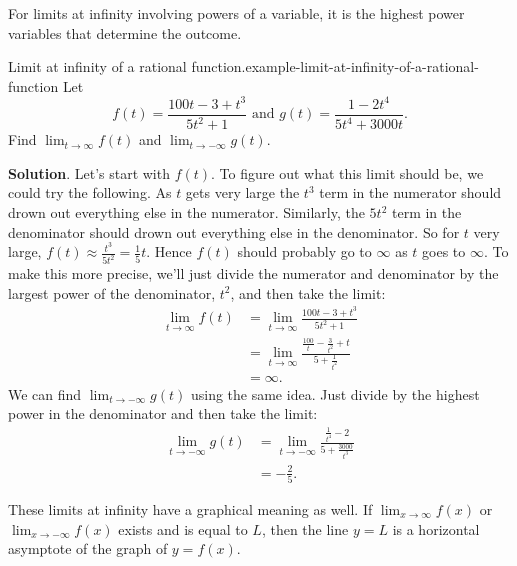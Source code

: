 \documentclass[10pt,]{book}
\numberwithin{equation}{section}
\begin{document}
\hypertarget{p-67}{}%
For limits at infinity involving powers of a variable, it is the highest power variables that determine the outcome.%
\begin{example}{Limit at infinity of a rational function.}{example-limit-at-infinity-of-a-rational-function}%
\hypertarget{p-68}{}%
Let%
\begin{equation*}
f(t) = \frac{100t - 3 + t^{3}}{5t^{2}+1}\text{ and } g(t) = \frac{1-2t^{4}}{5t^{4}+3000t}.
\end{equation*}
Find \(\lim_{t\to\infty} f(t)\) and \(\lim_{t\to-\infty}g(t)\).%
\par\smallskip%
\noindent\textbf{Solution}.\hypertarget{solution-14}{}\quad%
\hypertarget{p-69}{}%
Let's start with \(f(t)\). To figure out what this limit should be, we could try the following. As \(t\) gets very large the \(t^{3}\) term in the numerator should drown out everything else in the numerator. Similarly, the \(5t^{2}\) term in the denominator should drown out everything else in the denominator. So for \(t\) very large, \(f(t)\approx\frac{t^{3}}{5t^{2}} = \frac{1}{5}t\). Hence \(f(t)\) should probably go to \(\infty\) as \(t\) goes to \(\infty\). To make this more precise, we'll just divide the numerator and denominator by the largest power of the denominator, \(t^{2}\), and then take the limit:%
%
\begin{align*}
\lim_{t\to\infty}f(t) & = \lim_{t\to\infty}\frac{100t-3+t^{3}}{5t^{2}+1} \\
& = \lim_{t\to\infty}\frac{\frac{100}{t} - \frac{3}{t^{2}}+t}{5+\frac{1}{t^{2}}} \\
& = \infty. 
\end{align*}
\hypertarget{p-70}{}%
We can find \(\lim_{t\to-\infty}g(t)\) using the same idea. Just divide by the highest power in the denominator and then take the limit:%
%
\begin{align*}
\lim_{t\to-\infty}g(t) & = \lim_{t\to-\infty}\frac{\frac{1}{t^{4}}-2}{5+\frac{3000}{t^{3}}} \\
& = -\frac{2}{5}. 
\end{align*}
\end{example}
\hypertarget{p-71}{}%
These limits at infinity have a graphical meaning as well. If \(\lim_{x\to\infty}f(x)\) or \(\lim_{x\to-\infty}f(x)\) exists and is equal to \(L\), then the line \(y=L\) is a horizontal asymptote of the graph of \(y=f(x)\).%
\end{document}
